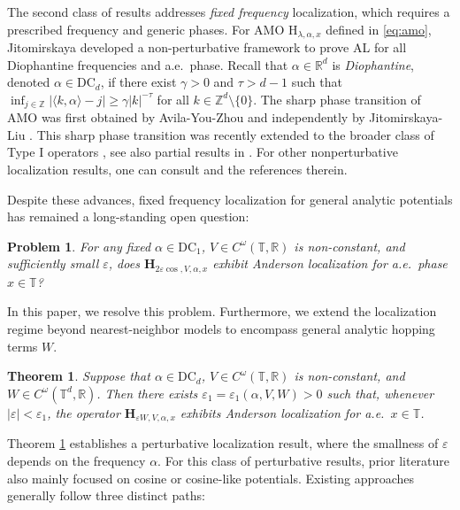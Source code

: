 \documentclass[reqno,11pt]{amsart}
\newtheorem{theorem}{Theorem}[section]
\newtheorem{problem}{Problem}
\newcommand{\Z}{{\mathbb Z}}
\newcommand{\R}{{\mathbb R}}
\newcommand{\T}{{\mathbb T}}
\begin{document}
The second class of results  addresses \emph{fixed frequency} localization, which requires a prescribed frequency and generic phases. 
For AMO $\mathrm{H}_{\lambda, \alpha, x}$ defined in \eqref{eq:amo}, Jitomirskaya \cite{Jit94, Jit99} developed a non-perturbative framework to prove AL for all Diophantine frequencies and a.e.\ phase. Recall that $\alpha \in \R^d$ is \emph{Diophantine}, denoted $\alpha \in \mathrm{DC}_d$, if there exist $\gamma > 0$ and $\tau > d-1$ such that $\inf_{j\in\Z}|\langle k,\alpha\rangle-j| \ge \gamma |k|^{-\tau}$ for all $k \in \Z^d \setminus \{0\}$. The sharp phase transition of AMO  was first obtained by Avila-You-Zhou \cite{AYZ} and independently by Jitomirskaya-Liu \cite{JL18}. This sharp phase transition was recently extended to  the broader class of Type I operators \cite{GJ}, see also partial results in \cite{hs, HS}. For other nonperturbative localization results, one can consult  \cite{AJ2,AJZ,BJ,JL24,JY,HS4,Liu2,Liu3,Liu4,LY3,LY2} and the references therein.   

Despite these advances, fixed frequency localization for general analytic potentials has remained a long-standing open question:

\begin{problem}\label{prob:1}
For any fixed $\alpha\in \mathrm{DC}_1$, $V\in C^{\omega}(\T,\R)$ is non-constant, and sufficiently small $\varepsilon$, does $\mathbf{H}_{2\varepsilon \cos,V,\alpha,x}$ exhibit Anderson localization for a.e.\ phase $x\in \T$?
\end{problem}

In this paper, we resolve this problem. Furthermore, we extend the localization regime beyond nearest-neighbor models to encompass general analytic hopping terms $W$.

\begin{theorem}\label{mainthe:loca}
Suppose that $\alpha\in \mathrm{DC}_d$, $V\in C^{\omega}(\T,\R)$ is non-constant, and $W\in C^{\omega}(\T^d,\R)$. Then there exists $\varepsilon_1 = \varepsilon_1(\alpha, V, W) > 0$ such that, whenever $|\varepsilon| < \varepsilon_1$, the operator $\mathbf{H}_{\varepsilon W,V,\alpha,x}$ exhibits Anderson localization for a.e.\ $x \in \mathbb{T}$.
\end{theorem}
Theorem \ref{mainthe:loca} establishes a perturbative localization result, where the smallness of $\varepsilon$  depends on the frequency $\alpha$. For this class of perturbative results, prior literature also mainly focused on cosine or cosine-like potentials. Existing approaches generally follow three distinct paths:
\end{document}
